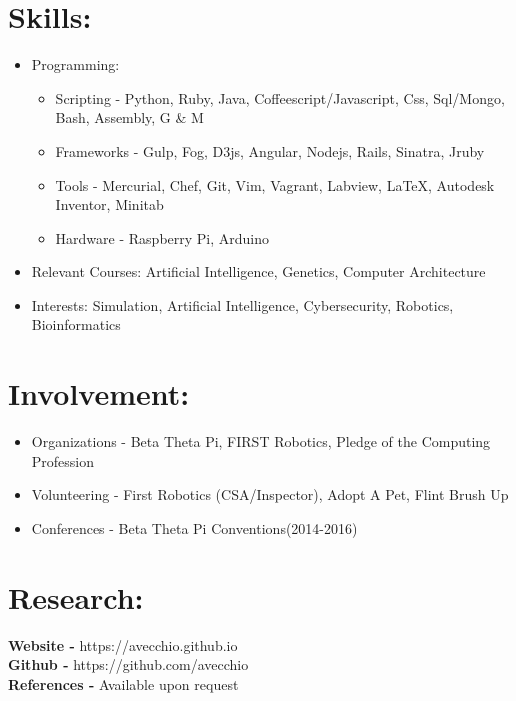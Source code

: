 \documentclass{res}
\begin{document}
\section{Skills:}
\begin{itemize}[leftmargin=*]
\item Programming:
\begin{itemize}[label=$\circ$]
\item Scripting - Python, Ruby, Java, Coffeescript/Javascript, Css, Sql/Mongo, Bash, Assembly, G \& M
\item Frameworks - Gulp, Fog, D3js, Angular, Nodejs, Rails, Sinatra, Jruby
\item Tools - Mercurial, Chef, Git, Vim, Vagrant, Labview, \LaTeX, Autodesk Inventor, Minitab
\item Hardware - Raspberry Pi, Arduino
\end{itemize}
\item Relevant Courses: Artificial Intelligence, Genetics, Computer Architecture
\item Interests: Simulation, Artificial Intelligence, Cybersecurity, Robotics, Bioinformatics
\end{itemize}

\section{Involvement:}
\begin{itemize}[leftmargin=*]
\item Organizations - Beta Theta Pi, FIRST Robotics, Pledge of the Computing Profession
\item Volunteering - First Robotics (CSA/Inspector), Adopt A Pet, Flint Brush Up
\item Conferences - Beta Theta Pi Conventions(2014-2016)%
\end{itemize}

\section{Research:}
\begin{itemize}[leftmargin=*]
\end{itemize}

\begin{center}
\textbf{Website - }https://avecchio.github.io\\
\textbf{Github - }https://github.com/avecchio\\
\textbf{References - }Available upon request
\end{center}
\end{document}
